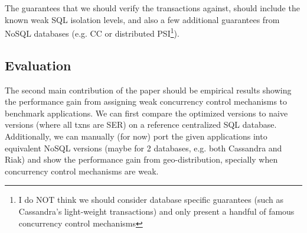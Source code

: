 \documentclass[12pt,letter]{article}
\begin{document}
The
guarantees that we should verify the transactions against, should include the known weak
SQL isolation levels, and also a few additional guarantees from NoSQL
databases (e.g. CC or distributed PSI\footnote{I do NOT think we should consider
database specific guarantees (such as Cassandra's light-weight transactions) and
only present a handful of famous concurrency control mechanisms}).

\subsection{Evaluation}
The second main contribution of the paper should be empirical results showing the
performance gain from assigning weak concurrency control mechanisms to benchmark
applications. We can first compare the optimized versions to naive versions
(where all txns are SER) on a reference centralized SQL database. Additionally,
we can manually (for now) port the given applications into equivalent NoSQL
versions (maybe for 2 databases, e.g. both Cassandra and Riak) and show the
performance gain from geo-distribution, specially when concurrency control
mechanisms are weak.






\end{document}
